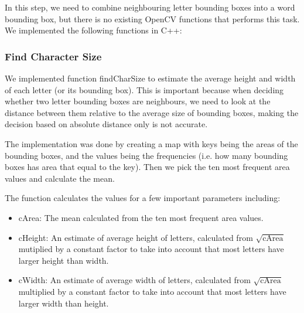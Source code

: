 \documentclass[conference]{IEEEtran}
\begin{document}
In this step, we need to combine neighbouring letter bounding boxes into a word bounding box, but there is no existing OpenCV functions that performs this task.  We implemented the following functions in C++:

\subsubsection{Find Character Size}
We implemented function findCharSize to estimate the average height and width of each letter (or its bounding box).  This is important because when deciding whether two letter bounding boxes are neighbours, we need to look at the distance between them relative to the average size of bounding boxes, making the decision based on absolute distance only is not accurate.

The implementation was done by creating a map with keys being the areas of the bounding boxes, and the values being the frequencies (i.e. how many bounding boxes has area that equal to the key).  Then we pick the ten most frequent area values and calculate the mean.

The function calculates the values for a few important parameters including:
\begin{itemize}
\item cArea: The mean calculated from the ten most frequent area values.
\item cHeight: An estimate of average height of letters, calculated from $\sqrt{\mbox{cArea}}$ mutiplied by a constant factor to take into account that most letters have larger height than width.
\item cWidth: An estimate of average width of letters, calculated from $\sqrt{\mbox{cArea}}$ multiplied by a constant factor to take into account that most letters have larger width than height.
\end{itemize}
\end{document}
